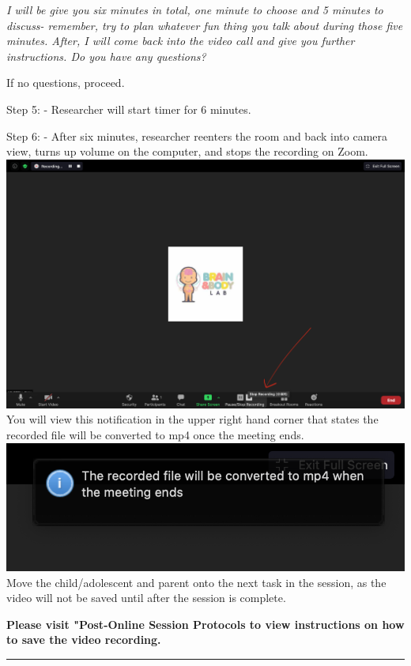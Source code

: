 \documentclass[]{book}
\begin{document}
\emph{I will be give you six minutes in total, one minute to choose and 5 minutes to discuss- remember, try to plan whatever fun thing you talk about during those five minutes. After, I will come back into the video call and give you further instructions. Do you have any questions?}

If no questions, proceed.

Step 5:
- Researcher will start timer for 6 minutes.

Step 6:
- After six minutes, researcher reenters the room and back into camera view, turns up volume on the computer, and stops the recording on Zoom. \includegraphics{images/zoom_parent_child_interaction/5.png} You will view this notification in the upper right hand corner that states the recorded file will be converted to mp4 once the meeting ends. \includegraphics{images/zoom_parent_child_interaction/6.png} Move the child/adolescent and parent onto the next task in the session, as the video will not be saved until after the session is complete.

\textbf{Please visit "Post-Online Session Protocols to view instructions on how to save the video recording.}

\begin{center}\rule{0.5\linewidth}{0.5pt}\end{center}
\end{document}
